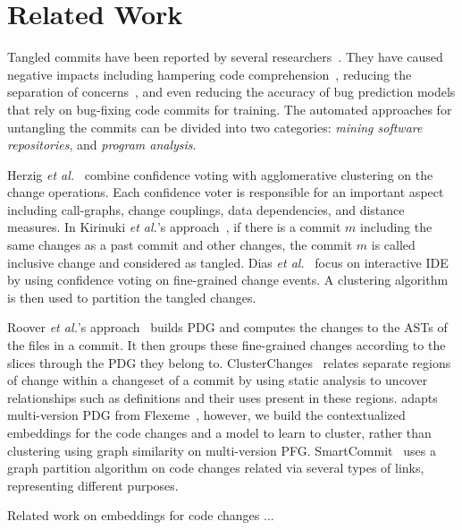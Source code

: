 \section{Related Work}
\label{related:sec}

Tangled commits have been reported by several
researchers~\cite{tao-fse12,kim-emse16,kim-msr13,hill-tse12,nguyen-issre13,flexeme-fse20,smartcommit-fse21}. They
have caused negative impacts including hampering code
comprehension~\cite{tao-fse12}, reducing the separation of
concerns~\cite{flexeme-fse20}, and even reducing the accuracy of bug
prediction models that rely on bug-fixing code commits for training.
The automated approaches for untangling the commits can be divided
into two categories: {\em mining software repositories}, and {\em
  program analysis}.

 Herzig {\em et
  al.}~\cite{kim-msr13,kim-emse16} combine confidence voting with
agglomerative clustering on the change operations. Each confidence
voter is responsible for an important aspect including call-graphs,
change couplings, data dependencies, and distance measures. In
Kirinuki {\em et al.}'s approach~\cite{higo-apsec16, higo-icpc14}, if
there is a commit $m$ including the same changes as a past commit and
other changes, the commit $m$ is called inclusive change and
considered as tangled.  Dias {\em et al.}~\cite{dias-saner15} focus on
interactive IDE by using confidence voting on fine-grained change
events. A clustering algorithm is then used to partition the tangled
changes.


 Roover {\em et al.}'s
approach~\cite{roover-scam18} builds PDG and computes the changes to
the ASTs of the files in a commit. It then groups these fine-grained
changes according to the slices through the PDG they belong to.
ClusterChanges~\cite{barnett-icse15} relates separate regions of
change within a changeset of a commit by using static analysis to
uncover relationships such as definitions and their uses present in
these regions. {\tool} adapts multi-version PDG from
Flexeme~\cite{flexeme-fse20}, however, we build the contextualized
embeddings for the code changes and a model to learn to cluster,
rather than clustering using graph similarity on multi-version PFG.
SmartCommit~\cite{smartcommit-fse21} uses a graph partition algorithm
on code changes related via several types of links, representing
different purposes.



Related work on embeddings for code changes ...
